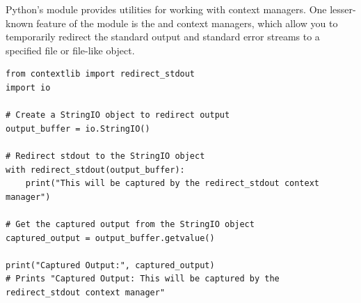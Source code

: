 Python's  module provides utilities for working with context managers. One lesser-known feature of the  module is the  and  context managers, which allow you to temporarily redirect the standard output and standard error streams to a specified file or file-like object.
\begin{lstlisting}
from contextlib import redirect_stdout
import io

# Create a StringIO object to redirect output
output_buffer = io.StringIO()

# Redirect stdout to the StringIO object
with redirect_stdout(output_buffer):
    print("This will be captured by the redirect_stdout context manager")

# Get the captured output from the StringIO object
captured_output = output_buffer.getvalue()

print("Captured Output:", captured_output)
# Prints "Captured Output: This will be captured by the redirect_stdout context manager"
\end{lstlisting}


















